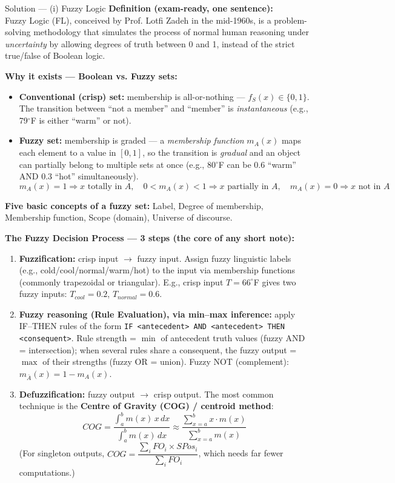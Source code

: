 \documentclass[12pt,a4paper]{article}
\begin{document}
\begin{solbox}{Solution --- (i) Fuzzy Logic}
\textbf{Definition (exam-ready, one sentence):}\\
Fuzzy Logic (FL), conceived by Prof. Lotfi Zadeh in the mid-1960s, is a problem-solving methodology that simulates the process of normal human reasoning under \emph{uncertainty} by allowing degrees of truth between 0 and 1, instead of the strict true/false of Boolean logic.

\textbf{Why it exists --- Boolean vs. Fuzzy sets:}
\begin{itemize}[noitemsep]
  \item \textbf{Conventional (crisp) set:} membership is all-or-nothing --- $f_S(x) \in \{0,1\}$. The transition between ``not a member'' and ``member'' is \emph{instantaneous} (e.g., 79$^\circ$F is either ``warm'' or not).
  \item \textbf{Fuzzy set:} membership is graded --- a \emph{membership function} $m_A(x)$ maps each element to a value in $[0,1]$, so the transition is \emph{gradual} and an object can partially belong to multiple sets at once (e.g., 80$^\circ$F can be 0.6 ``warm'' AND 0.3 ``hot'' simultaneously).
  \[
  m_A(x) = 1 \Rightarrow x \text{ totally in } A, \quad
  0 < m_A(x) < 1 \Rightarrow x \text{ partially in } A, \quad
  m_A(x) = 0 \Rightarrow x \text{ not in } A
  \]
\end{itemize}

\textbf{Five basic concepts of a fuzzy set:} Label, Degree of membership, Membership function, Scope (domain), Universe of discourse.

\textbf{The Fuzzy Decision Process --- 3 steps (the core of any short note):}
\begin{enumerate}[noitemsep]
  \item \textbf{Fuzzification:} crisp input $\to$ fuzzy input. Assign fuzzy linguistic labels (e.g., cold/cool/normal/warm/hot) to the input via membership functions (commonly trapezoidal or triangular). E.g., crisp input $T=66^\circ$F gives two fuzzy inputs: $T_{cool}=0.2$, $T_{normal}=0.6$.
  \item \textbf{Fuzzy reasoning (Rule Evaluation), via min--max inference:} apply IF--THEN rules of the form \texttt{IF <antecedent> AND <antecedent> THEN <consequent>}. Rule strength = $\min$ of antecedent truth values (fuzzy AND = intersection); when several rules share a consequent, the fuzzy output = $\max$ of their strengths (fuzzy OR = union). Fuzzy NOT (complement): $m_{\bar{A}}(x) = 1 - m_A(x)$.
  \item \textbf{Defuzzification:} fuzzy output $\to$ crisp output. The most common technique is the \textbf{Centre of Gravity (COG) / centroid method}:
  \[
  COG = \frac{\int_a^b m(x)\,x\,dx}{\int_a^b m(x)\,dx} \approx \frac{\sum_{x=a}^{b} x \cdot m(x)}{\sum_{x=a}^{b} m(x)}
  \]
  (For singleton outputs, $COG = \dfrac{\sum_i FO_i \times SPos_i}{\sum_i FO_i}$, which needs far fewer computations.)
\end{enumerate}


\end{solbox}
\end{document}
